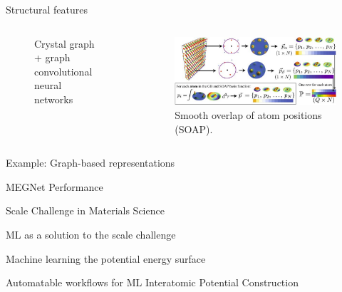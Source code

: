 \documentclass[aspectratio=169]{beamer}
\begin{document}
\begin{frame}{Structural features}
\begin{columns}
\begin{figure}
            \caption{Crystal graph + graph convolutional neural networks}
        \end{figure}
        \begin{figure}
            \centering
            \includegraphics[width=\textwidth]{lectures/slides_tex/soap.png}
            \caption{Smooth overlap of atom positions (SOAP).\cite{rosenbrockDiscoveringBuildingBlocks2017}}
        \end{figure}
    \end{columns}
\end{frame}


\begin{frame}{Example: Graph-based representations}
    
\end{frame}


\begin{frame}{MEGNet Performance}
    
\end{frame}


\begin{frame}{Scale Challenge in Materials Science}
    
\end{frame}


\begin{frame}{ML as a solution to the scale challenge}
    
\end{frame}


\begin{frame}{Machine learning the potential energy surface}
    
\end{frame}


\begin{frame}{Automatable workflows for ML Interatomic Potential Construction}
    
\end{frame}
\end{document}
